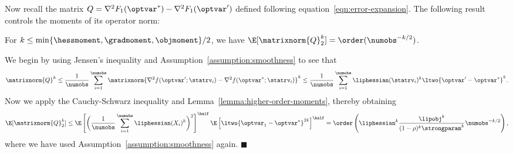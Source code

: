\documentclass[11pt,twoside]{article}
\newcommand{\qed}{\hspace{\stretch{1}}
  $\blacksquare$
}
\renewenvironment{proof}{\noindent{\bf Proof}\hspace*{1em}}{\qed\\}
\theoremstyle{definition}
\begin{document}
\noindent Now recall the matrix $Q = \nabla^2 F_1(\optvar^*) -
\nabla^2 F_1(\optvar')$ defined following
equation~\eqref{eqn:error-expansion}.  The following result controls
the moments of its operator norm: \\
%
\begin{lemma}
  \label{lemma:higher-order-matrix-moments}
For $k \le \min\{\hessmoment, \gradmoment, \objmoment\} / 2$, we have
$\E[\matrixnorm{Q}_2^k] = \order(\numobs^{-k/2})$.
\end{lemma}
\begin{proof}
  We begin by using Jensen's inequality and
  Assumption~\ref{assumption:smoothness} to see that
  \begin{equation*}
    \matrixnorm{Q}^k
    \le \frac{1}{\numobs} \sum_{i=1}^\numobs
    \matrixnorm{\nabla^2 f(\optvar'; \statrv_i) - \nabla^2
      f(\optvar^*; \statrv_i)}^k
    \le
    \frac{1}{\numobs} \sum_{i=1}^\numobs \liphessian(\statrv_i)^k
    \ltwo{\optvar' - \optvar^*}^k.
  \end{equation*}
  Now we apply the Cauchy-Schwarz inequality and
  Lemma~\ref{lemma:higher-order-moments}, thereby obtaining
  \begin{equation*}
    \E[\matrixnorm{Q}_2^k]
    \le \E\left[
      \bigg(\frac{1}{\numobs} \sum_{i=1}^\numobs \liphessian(X_i)^k\bigg)^2
      \right]^\half
    \E\left[\ltwo{\optvar_1 - \optvar^*}^{2k}\right]^\half
    = \order\left( \liphessian^k \frac{\lipobj^k}{(1 - \rho)^k
      \strongparam^k} \numobs^{-k/2}\right),
  \end{equation*}
  where we have used Assumption~\ref{assumption:smoothness} again.
\end{proof}
\end{document}

